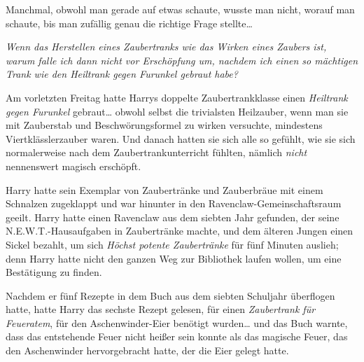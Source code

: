 Manchmal, obwohl man gerade auf etwas schaute, wusste man nicht, worauf man schaute, bis man zufällig genau die richtige Frage stellte…

\emph{Wenn das Herstellen eines Zaubertranks wie das Wirken eines Zaubers ist, warum falle ich dann nicht vor Erschöpfung um, nachdem ich einen so mächtigen Trank wie den Heiltrank gegen Furunkel gebraut habe?}

Am vorletzten Freitag hatte Harrys doppelte Zaubertrankklasse einen \emph{Heiltrank gegen Furunkel} gebraut… obwohl selbst die trivialsten Heilzauber, wenn man sie mit Zauberstab und Beschwörungsformel zu wirken versuchte, mindestens Viertklässlerzauber waren. Und danach hatten sie sich alle so gefühlt, wie sie sich normalerweise nach dem Zaubertrankunterricht fühlten, nämlich \emph{nicht} nennenswert magisch erschöpft.

Harry hatte sein Exemplar von Zaubertränke und Zauberbräue mit einem Schnalzen zugeklappt und war hinunter in den Ravenclaw-Gemeinschaftsraum geeilt. Harry hatte einen Ravenclaw aus dem siebten Jahr gefunden, der seine N.E.W.T.-Hausaufgaben in Zaubertränke machte, und dem älteren Jungen einen Sickel bezahlt, um sich \emph{Höchst potente Zaubertränke} für fünf Minuten auslieh; denn Harry hatte nicht den ganzen Weg zur Bibliothek laufen wollen, um eine Bestätigung zu finden.

Nachdem er fünf Rezepte in dem Buch aus dem siebten Schuljahr überflogen hatte, hatte Harry das sechste Rezept gelesen, für einen \emph{Zaubertrank für Feueratem}, für den Aschenwinder-Eier benötigt wurden… und das Buch warnte, dass das entstehende Feuer nicht heißer sein konnte als das magische Feuer, das den Aschenwinder hervorgebracht hatte, der die Eier gelegt hatte.

